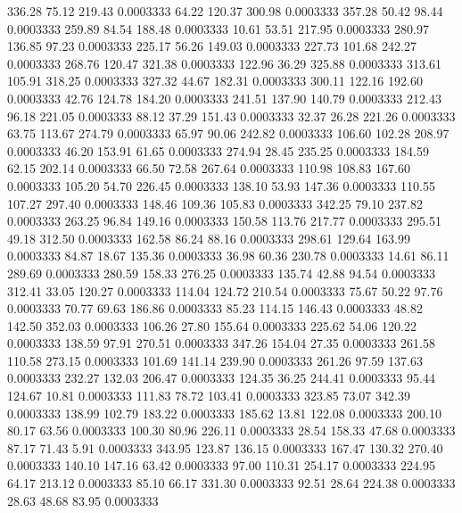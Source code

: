  336.28   75.12  219.43   0.0003333
  64.22  120.37  300.98   0.0003333
 357.28   50.42   98.44   0.0003333
 259.89   84.54  188.48   0.0003333
  10.61   53.51  217.95   0.0003333
 280.97  136.85   97.23   0.0003333
 225.17   56.26  149.03   0.0003333
 227.73  101.68  242.27   0.0003333
 268.76  120.47  321.38   0.0003333
 122.96   36.29  325.88   0.0003333
 313.61  105.91  318.25   0.0003333
 327.32   44.67  182.31   0.0003333
 300.11  122.16  192.60   0.0003333
  42.76  124.78  184.20   0.0003333
 241.51  137.90  140.79   0.0003333
 212.43   96.18  221.05   0.0003333
  88.12   37.29  151.43   0.0003333
  32.37   26.28  221.26   0.0003333
  63.75  113.67  274.79   0.0003333
  65.97   90.06  242.82   0.0003333
 106.60  102.28  208.97   0.0003333
  46.20  153.91   61.65   0.0003333
 274.94   28.45  235.25   0.0003333
 184.59   62.15  202.14   0.0003333
  66.50   72.58  267.64   0.0003333
 110.98  108.83  167.60   0.0003333
 105.20   54.70  226.45   0.0003333
 138.10   53.93  147.36   0.0003333
 110.55  107.27  297.40   0.0003333
 148.46  109.36  105.83   0.0003333
 342.25   79.10  237.82   0.0003333
 263.25   96.84  149.16   0.0003333
 150.58  113.76  217.77   0.0003333
 295.51   49.18  312.50   0.0003333
 162.58   86.24   88.16   0.0003333
 298.61  129.64  163.99   0.0003333
  84.87   18.67  135.36   0.0003333
  36.98   60.36  230.78   0.0003333
  14.61   86.11  289.69   0.0003333
 280.59  158.33  276.25   0.0003333
 135.74   42.88   94.54   0.0003333
 312.41   33.05  120.27   0.0003333
 114.04  124.72  210.54   0.0003333
  75.67   50.22   97.76   0.0003333
  70.77   69.63  186.86   0.0003333
  85.23  114.15  146.43   0.0003333
  48.82  142.50  352.03   0.0003333
 106.26   27.80  155.64   0.0003333
 225.62   54.06  120.22   0.0003333
 138.59   97.91  270.51   0.0003333
 347.26  154.04   27.35   0.0003333
 261.58  110.58  273.15   0.0003333
 101.69  141.14  239.90   0.0003333
 261.26   97.59  137.63   0.0003333
 232.27  132.03  206.47   0.0003333
 124.35   36.25  244.41   0.0003333
  95.44  124.67   10.81   0.0003333
 111.83   78.72  103.41   0.0003333
 323.85   73.07  342.39   0.0003333
 138.99  102.79  183.22   0.0003333
 185.62   13.81  122.08   0.0003333
 200.10   80.17   63.56   0.0003333
 100.30   80.96  226.11   0.0003333
  28.54  158.33   47.68   0.0003333
  87.17   71.43    5.91   0.0003333
 343.95  123.87  136.15   0.0003333
 167.47  130.32  270.40   0.0003333
 140.10  147.16   63.42   0.0003333
  97.00  110.31  254.17   0.0003333
 224.95   64.17  213.12   0.0003333
  85.10   66.17  331.30   0.0003333
  92.51   28.64  224.38   0.0003333
  28.63   48.68   83.95   0.0003333
